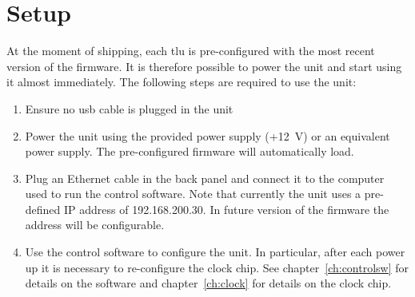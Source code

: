 \section{Setup}\label{ch:setup}
At the moment of shipping, each \gls{tlu} is pre-configured with the most recent version of the firmware. It is therefore possible to power the unit and start using it almost immediately. The following steps are required to use the unit:
\begin{enumerate}
  \item Ensure no \gls{usb} cable is plugged in the unit
  \item Power the unit using the provided power supply (+12~V) or an equivalent power supply. The pre-configured firmware will automatically load.
  \item Plug an Ethernet cable in the back panel and connect it to the computer used to run the control software. Note that currently the unit uses a pre-defined IP address of 192.168.200.30. In future version of the firmware the address will be configurable.
  \item Use the control software to configure the unit. In particular, after each power up it is necessary to re-configure the clock chip. See chapter~\ref{ch:controlsw} for details on the software and chapter~\ref{ch:clock} for details on the clock chip.
\end{enumerate}

